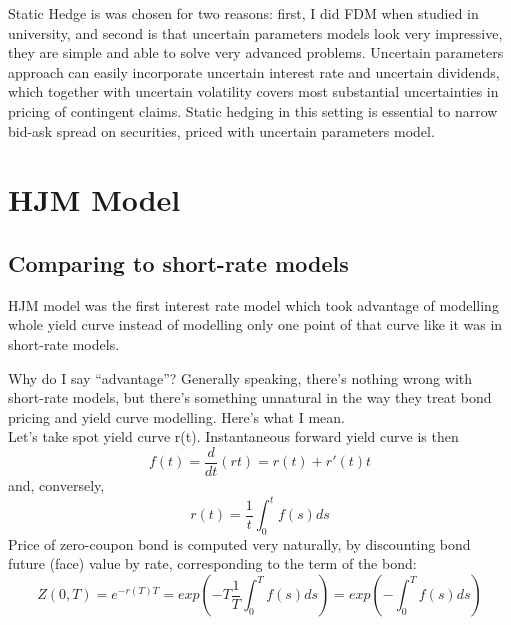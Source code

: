 \documentclass[11pt]{article} %
\begin{document}
Static Hedge is was chosen for two reasons: first, I did FDM when studied in university, and second is that uncertain parameters models look very impressive, they are simple and able to solve very advanced problems. Uncertain parameters approach can easily incorporate uncertain interest rate and uncertain dividends, which together with uncertain volatility covers most substantial uncertainties in pricing of contingent claims. Static hedging in this setting is essential to narrow bid-ask spread on securities, priced with uncertain parameters model.

\section{HJM Model}

\subsection{Comparing to short-rate models}

HJM model was the first interest rate model which took advantage of modelling whole yield curve instead of modelling only one point of that curve like it was in short-rate models.

Why do I say ``advantage''? Generally speaking, there's nothing wrong with short-rate models, but there's something unnatural in the way they treat bond pricing and yield curve modelling. Here's what I mean.\\
Let's take spot yield curve r(t). Instantaneous forward yield curve is then %
\begin{equation}
f(t) = \frac{d}{dt}(rt) = r(t) + r'(t) t
\end{equation}
and, conversely, 
\begin{equation}
r(t) = \frac{1}{t}\int_{0}^{t}{f(s)ds}
\end{equation}
Price of zero-coupon bond is computed very naturally, by discounting bond future (face) value by rate, corresponding to the term of the bond:
\begin{equation} \label{eq:truebondprice}
Z(0,T) = e^{-r(T)T} = exp\left(-T\frac{1}{T}\int_{0}^{T}{f(s)ds}\right) = exp\left(-\int_{0}^{T}{f(s)ds}\right)
\end{equation}
\end{document}
